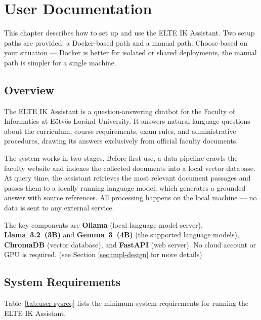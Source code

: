 \chapter{User Documentation}
\label{ch:user}

This chapter describes how to set up and use the ELTE IK Assistant.
Two setup paths are provided: a Docker-based path and a manual path.
Choose based on your situation --- Docker is better for isolated or shared
deployments, the manual path is simpler for a single machine.

\section{Overview}
\label{sec:user-overview}

The ELTE IK Assistant is a question-answering chatbot for the Faculty of
Informatics at Eötvös Loránd University. It answers natural language
questions about the curriculum, course requirements, exam rules, and
administrative procedures, drawing its answers exclusively from official
faculty documents.

The system works in two stages. Before first use, a data pipeline crawls
the faculty website and indexes the collected documents into a local vector
database. At query time, the assistant retrieves the most relevant document
passages and passes them to a locally running language model, which
generates a grounded answer with source references. All processing happens
on the local machine --- no data is sent to any external service.

The key components are \textbf{Ollama} (local language model server),
\textbf{Llama~3.2~(3B)} and \textbf{Gemma~3~(4B)} (the supported language
models), \textbf{ChromaDB} (vector database), and \textbf{FastAPI}
(web server). No cloud account or GPU is required. (see Section \ref{sec:impl-design} for more details)

\section{System Requirements}
\label{sec:user-requirements}

Table~\ref{tab:user-sysreq} lists the minimum system requirements for running
the ELTE IK Assistant.

